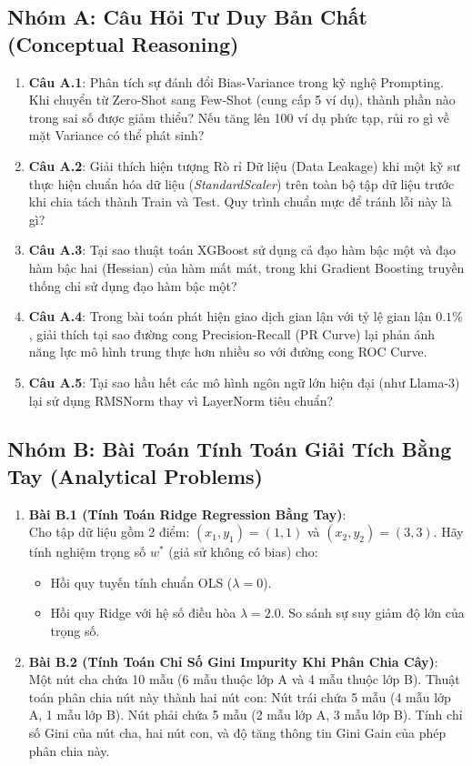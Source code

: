 \subsection{Nhóm A: Câu Hỏi Tư Duy Bản Chất (Conceptual Reasoning)}
\begin{enumerate}
  \item \textbf{Câu A.1}: Phân tích sự đánh đổi Bias-Variance trong kỹ nghệ Prompting. Khi chuyển từ Zero-Shot sang Few-Shot (cung cấp 5 ví dụ), thành phần nào trong sai số được giảm thiểu? Nếu tăng lên 100 ví dụ phức tạp, rủi ro gì về mặt Variance có thể phát sinh?
  \item \textbf{Câu A.2}: Giải thích hiện tượng Rò rỉ Dữ liệu (Data Leakage) khi một kỹ sư thực hiện chuẩn hóa dữ liệu (\textit{StandardScaler}) trên toàn bộ tập dữ liệu trước khi chia tách thành Train và Test. Quy trình chuẩn mực để tránh lỗi này là gì?
  \item \textbf{Câu A.3}: Tại sao thuật toán XGBoost sử dụng cả đạo hàm bậc một và đạo hàm bậc hai (Hessian) của hàm mất mát, trong khi Gradient Boosting truyền thống chỉ sử dụng đạo hàm bậc một?
  \item \textbf{Câu A.4}: Trong bài toán phát hiện giao dịch gian lận với tỷ lệ gian lận $0.1\%$, giải thích tại sao đường cong Precision-Recall (PR Curve) lại phản ánh năng lực mô hình trung thực hơn nhiều so với đường cong ROC Curve.
  \item \textbf{Câu A.5}: Tại sao hầu hết các mô hình ngôn ngữ lớn hiện đại (như Llama-3) lại sử dụng RMSNorm thay vì LayerNorm tiêu chuẩn?
\end{enumerate}

\subsection{Nhóm B: Bài Toán Tính Toán Giải Tích Bằng Tay (Analytical Problems)}
\begin{enumerate}
  \item \textbf{Bài B.1 (Tính Toán Ridge Regression Bằng Tay)}: \\
  Cho tập dữ liệu gồm 2 điểm: $(x_1, y_1) = (1, 1)$ và $(x_2, y_2) = (3, 3)$.
  Hãy tính nghiệm trọng số $w^*$ (giả sử không có bias) cho:
  \begin{itemize}
    \item[a)] Hồi quy tuyến tính chuẩn OLS ($\lambda = 0$).
    \item[b)] Hồi quy Ridge với hệ số điều hòa $\lambda = 2.0$. So sánh sự suy giảm độ lớn của trọng số.
  \end{itemize}

  \item \textbf{Bài B.2 (Tính Toán Chỉ Số Gini Impurity Khi Phân Chia Cây)}: \\
  Một nút cha chứa 10 mẫu (6 mẫu thuộc lớp A và 4 mẫu thuộc lớp B).
  Thuật toán phân chia nút này thành hai nút con:
  Nút trái chứa 5 mẫu (4 mẫu lớp A, 1 mẫu lớp B).
  Nút phải chứa 5 mẫu (2 mẫu lớp A, 3 mẫu lớp B).
  Tính chỉ số Gini của nút cha, hai nút con, và độ tăng thông tin Gini Gain của phép phân chia này.
\end{enumerate}

